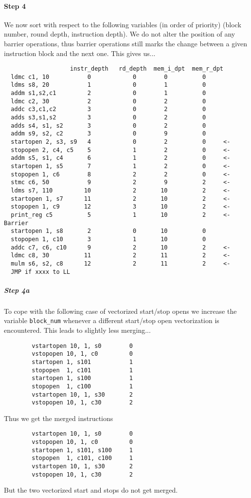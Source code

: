 \paragraph{Step 4}
We now sort with respect to the following variables (in order
of priority)
(block number, round depth, instruction depth).
We do not alter the position of any barrier operations,
thus barrier operations still marks the change between
a given instruction block and the next one.
This gives us...
\begin{verbatim}
                   instr_depth   rd_depth  mem_i_dpt  mem_r_dpt
  ldmc c1, 10           0            0        0          0
  ldms s8, 20           1            0        1          0
  addm s1,s2,c1         2            0        1          0
  ldmc c2, 30           2            0        2          0
  addc c3,c1,c2         3            0        2          0
  adds s3,s1,s2         3            0        2          0
  adds s4, s1, s2       3            0        2          0
  addm s9, s2, c2       3            0        9          0
  startopen 2, s3, s9   4            0        2          0     <-
  stopopen 2, c4, c5    5            1        2          0     <-
  addm s5, s1, c4       6            1        2          0     <-
  startopen 1, s5       7            1        2          0     <-
  stopopen 1, c6        8            2        2          0     <-
  stmc c6, 50           9            2        9          2     <-
  ldms s7, 110         10            2       10          2     <-
  startopen 1, s7      11            2       10          2     <-
  stopopen 1, c9       12            3       10          2     <-
  print_reg c5          5            1       10          2     <- Barrier
  startopen 1, s8       2            0       10          0
  stopopen 1, c10       3            1       10          0
  addc c7, c6, c10      9            2       10          2     <-
  ldmc c8, 30          11            2       11          2     <-
  mulm s6, s2, c8      12            2       11          2     <-
  JMP if xxxx to LL
\end{verbatim}


\subparagraph{Step 4a}
\label{sect4a}
To cope with the following case of vectorized start/stop opens
we increase the variable \verb+block_num+ whenever a different start/stop
open vectorization is encountered. This leads to slightly
less merging...
\begin{verbatim}
        vstartopen 10, 1, s0        0
        vstopopen 10, 1, c0         0
        startopen 1, s101           1
        stopopen  1, c101           1
        startopen 1, s100           1
        stopopen  1, c100           1
        vstartopen 10, 1, s30       2
        vstopopen 10, 1, c30        2
\end{verbatim}
Thus we get the merged instructions
\begin{verbatim}
        vstartopen 10, 1, s0        0
        vstopopen 10, 1, c0         0
        startopen 1, s101, s100     1
        stopopen  1, c101, c100     1
        vstartopen 10, 1, s30       2
        vstopopen 10, 1, c30        2
\end{verbatim}
But the two vectorized start and stops do not get merged.


